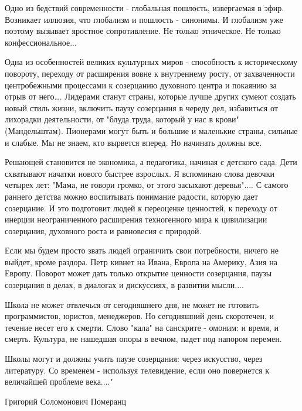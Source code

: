 Одно из бедствий современности - глобальная пошлость, извергаемая в эфир.
Возникает иллюзия, что глобализм и пошлость - синонимы. И глобализм уже
поэтому вызывает яростное сопротивление. Не только этническое. Не только
конфессиональное...

Одна из особенностей великих культурных миров - способность к историческому
повороту, переходу от расширения вовне к внутреннему росту, от
захваченности центробежными процессами к созерцанию духовного центра и
покаянию за отрыв от него…. Лидерами станут страны, которые лучше других
сумеют создать новый стиль жизни, включить паузу созерцания в череду дел,
избавиться от лихорадки деятельности, от "блуда труда, который у нас в
крови" (Мандельштам). Пионерами могут быть и большие и маленькие страны,
сильные и слабые. Мы не знаем, кто вырвется вперед. Но начинать должны все.

Решающей становится не экономика, а педагогика, начиная с детского сада.
Дети схватывают начатки нового быстрее взрослых. Я вспоминаю слова девочки
четырех лет: "Мама, не говори громко, от этого засыхают деревья".... С
самого раннего детства можно воспитывать понимание радости, которую дает
созерцание. И это подготовит людей к переоценке ценностей, к переходу от
инерции неограниченного расширения техногенного мира к цивилизации
созерцания, духовного роста и равновесия с природой.

Если мы будем просто звать людей ограничить свои потребности, ничего не
выйдет, кроме раздора. Петр кивнет на Ивана, Европа на Америку, Азия на
Европу. Поворот может дать только открытие ценности созерцания, паузы
созерцания в делах, в диалогах и дискуссиях, в развитии мысли....

Школа не может отвлечься от сегодняшнего дня, не может не готовить
программистов, юристов, менеджеров. Но сегодняшний день скоротечен, и
течение несет его к смерти. Слово "кала" на санскрите - омоним: и время, и
смерть. Культура, не нашедшая опоры в вечном, падет под напором перемен.

Школы могут и должны учить паузе созерцания: через искусство, через
литературу. Со временем - используя телевидение, если оно повернется к
величайшей проблеме века...."

Григорий Соломонович Померанц

